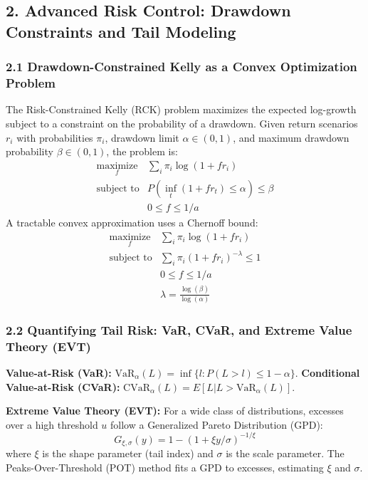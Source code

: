 \documentclass{article}
\begin{document}
\subsection*{2. Advanced Risk Control: Drawdown Constraints and Tail Modeling}

\subsubsection*{2.1 Drawdown-Constrained Kelly as a Convex Optimization Problem}
The Risk-Constrained Kelly (RCK) problem maximizes the expected log-growth subject to a constraint on the probability of a drawdown.  Given return scenarios $r_i$ with probabilities $\pi_i$, drawdown limit $\alpha \in (0,1)$, and maximum drawdown probability $\beta \in (0,1)$, the problem is:
$$ \begin{array}{ll}
\underset{f}{\text{maximize}} & \sum_i \pi_i \log(1+fr_i) \\
\text{subject to} & P(\inf_t (1+fr_t) \le \alpha) \le \beta \\
                    & 0 \le f \le 1/a
\end{array} $$
A tractable convex approximation uses a Chernoff bound:
$$ \begin{array}{ll}
\underset{f}{\text{maximize}} & \sum_i \pi_i \log(1+fr_i) \\
\text{subject to} & \sum_i \pi_i (1+fr_i)^{-\lambda} \le 1 \\
                    & 0 \le f \le 1/a \\
                    & \lambda = \frac{\log(\beta)}{\log(\alpha)}
\end{array} $$

\subsubsection*{2.2 Quantifying Tail Risk: VaR, CVaR, and Extreme Value Theory (EVT)}
\textbf{Value-at-Risk (VaR):}  $\text{VaR}_{\alpha}(L) = \inf\{l : P(L > l) \le 1-\alpha \}$.
\textbf{Conditional Value-at-Risk (CVaR):} $\text{CVaR}_{\alpha}(L) = E[L | L > \text{VaR}_{\alpha}(L)]$.

\textbf{Extreme Value Theory (EVT):} For a wide class of distributions, excesses over a high threshold $u$ follow a Generalized Pareto Distribution (GPD):
$$G_{\xi, \sigma}(y) = 1 - (1 + \xi y/\sigma)^{-1/\xi}$$
where $\xi$ is the shape parameter (tail index) and $\sigma$ is the scale parameter. The Peaks-Over-Threshold (POT) method fits a GPD to excesses, estimating $\xi$ and $\sigma$.
\end{document}

